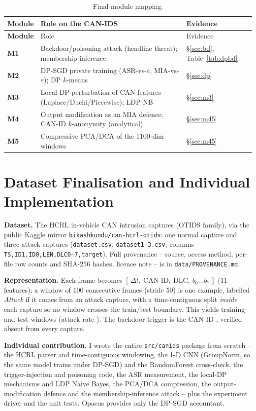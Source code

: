 \documentclass[11pt,a4paper]{article}
\begin{document}
\begin{longtable}{>{\bfseries}p{1.3cm}p{7.6cm}p{4.2cm}}
\caption{Final module mapping.}\label{tab:map}\\
\toprule Module & Role on the CAN-IDS & Evidence\\ \midrule\endfirsthead
\toprule Module & Role & Evidence\\ \midrule\endhead
M1 & Backdoor/poisoning attack (headline threat); membership inference & \S\ref{sec:bd}, Table~\ref{tab:dpbd}\\
M2 & DP-SGD private training (ASR-vs-$\varepsilon$, MIA-vs-$\varepsilon$); DP $k$-means & \S\ref{sec:dp}\\
M3 & Local DP perturbation of CAN features (Laplace/Duchi/Piecewise); LDP-NB & \S\ref{sec:m3}\\
M4 & Output modification as an MIA defence; CAN-ID $k$-anonymity (analytical) & \S\ref{sec:m45}\\
M5 & Compressive PCA/DCA of the 1100-dim windows & \S\ref{sec:m45}\\
\bottomrule\end{longtable}

\section{Dataset Finalisation and Individual Implementation}\label{sec:data}
\textbf{Dataset.} The HCRL in-vehicle CAN intrusion captures (OTIDS family), via
the public Kaggle mirror \texttt{bikashkundu/can-hcrl-otids}: one normal capture
and three attack captures (\texttt{dataset.csv}, \texttt{dataset1--3.csv};
columns \texttt{TS,ID1,ID0,LEN,DLC0--7,target}). Full provenance -- source, access
method, per-file row counts and SHA-256 hashes, licence note -- is in
\texttt{data/PROVENANCE.md}.

\noindent\textbf{Representation.} Each frame becomes
$[\,\Delta t,\ \text{CAN ID},\ \text{DLC},\ b_0\ldots b_7\,]$ (11 features); a window
of 100 consecutive frames (stride 50) is one example, labelled \emph{Attack} if it
comes from an attack capture, with a time-contiguous split \emph{inside} each
capture so no window crosses the train/test boundary. This yields \Ntrain{}
training and \Ntest{} test windows (attack rate \AttackRate). The backdoor trigger
is the CAN ID \Trigger, verified absent from every capture.

\begin{shaded}\small\noindent\textbf{Individual contribution.} I wrote the entire
\texttt{src/canids} package from scratch -- the HCRL parser and time-contiguous
windowing, the 1-D CNN (GroupNorm, so the same model trains under DP-SGD) and the
RandomForest cross-check, the trigger-injection and poisoning code, the ASR
measurement, the local-DP mechanisms and LDP Naive Bayes, the PCA/DCA compression,
the output-modification defence and the membership-inference attack -- plus the
experiment driver and the unit tests. Opacus provides only the DP-SGD accountant.
\end{shaded}
\end{document}
